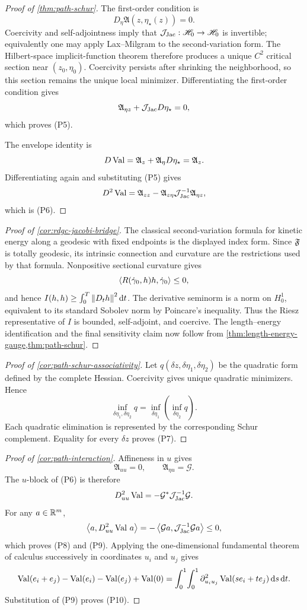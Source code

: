 \begin{proof}[Proof of \cref{thm:path-schur}]
The first-order condition is
\[
  D_\eta\mathfrak A(z,\eta_\star(z))=0.
\]
Coercivity and self-adjointness imply that \(\mathcal J_{\mathrm{Jac}}:\mathscr H_0\to\mathscr H_0\) is
invertible; equivalently one may apply Lax--Milgram to the second-variation
form.  The Hilbert-space implicit-function theorem therefore produces a unique
\(C^2\) critical section near \((z_0,\eta_0)\).  Coercivity persists after
shrinking the neighborhood, so this section remains the unique local
minimizer.  Differentiating the first-order condition gives
\[
  \mathfrak A_{\eta z}+\mathcal J_{\mathrm{Jac}} D\eta_\star=0,
\]
which proves (P5).

The envelope identity is
\[
  D\operatorname{Val}
  =
  \mathfrak A_z+\mathfrak A_\eta D\eta_\star
  =
  \mathfrak A_z.
\]
Differentiating again and substituting (P5) gives
\[
  D^2\operatorname{Val}
  =
  \mathfrak A_{zz}
  -\mathfrak A_{z\eta}\mathcal J_{\mathrm{Jac}}^{-1}\mathfrak A_{\eta z},
\]
which is (P6).
\end{proof}

\begin{proof}[Proof of \cref{cor:rdgc-jacobi-bridge}]
The classical second-variation formula for kinetic energy along a geodesic
with fixed endpoints is the displayed index form.  Since \(\mathfrak F\) is totally
geodesic, its intrinsic connection and curvature are the restrictions used by
that formula.  Nonpositive sectional curvature gives
\[
  \left\langle R(\dot\gamma_0,h)h,\dot\gamma_0\right\rangle\le0,
\]
and hence
\(I(h,h)\ge\int_0^T\left\lVert D_th\right\rVert^2\mathrm d t\).  The derivative seminorm is a norm
on \(H_0^1\), equivalent to its standard Sobolev norm by Poincare's inequality.
Thus the Riesz representative of \(I\) is bounded, self-adjoint, and coercive.
The length--energy identification and the final sensitivity claim now follow
from \cref{thm:length-energy-gauge,thm:path-schur}.
\end{proof}

\begin{proof}[Proof of \cref{cor:path-schur-associativity}]
Let \(q(\delta z,\delta\eta_1,\delta\eta_2)\) be the quadratic form defined by
the complete Hessian.  Coercivity gives unique quadratic minimizers.  Hence
\[
  \inf_{\delta\eta_1,\delta\eta_2}q
  =
  \inf_{\delta\eta_1}
  \left(\inf_{\delta\eta_2}q\right).
\]
Each quadratic elimination is represented by the corresponding Schur
complement.  Equality for every \(\delta z\) proves (P7).
\end{proof}

\begin{proof}[Proof of \cref{cor:path-interaction}]
Affineness in \(u\) gives
\[
  \mathfrak A_{uu}=0,
  \qquad
  \mathfrak A_{\eta u}=\mathcal G.
\]
The \(u\)-block of (P6) is therefore
\[
  D^2_{uu}\operatorname{Val}=-\mathcal G^*\mathcal J_{\mathrm{Jac}}^{-1}\mathcal G.
\]
For any \(a\in\mathbb R^m\),
\[
  \left\langle a,D^2_{uu}\operatorname{Val}\,a\right\rangle
  =
  -\left\langle \mathcal Ga,\mathcal J_{\mathrm{Jac}}^{-1}\mathcal Ga\right\rangle\le0,
\]
which proves (P8) and (P9).  Applying the one-dimensional fundamental theorem
of calculus successively in coordinates \(u_i\) and \(u_j\) gives
\[
  \operatorname{Val}(e_i+e_j)-\operatorname{Val}(e_i)-\operatorname{Val}(e_j)+\operatorname{Val}(0)
  =
  \int_0^1\!\int_0^1
  \partial^2_{u_i u_j}\operatorname{Val}(se_i+te_j)\,\mathrm d s\,\mathrm d t.
\]
Substitution of (P9) proves (P10).
\end{proof}

